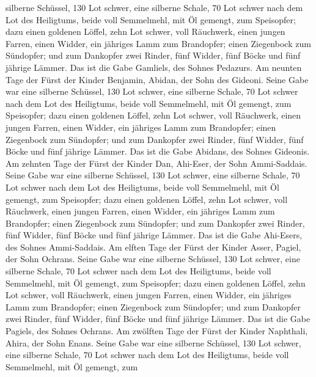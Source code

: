 silberne Schüssel, 130 Lot schwer, eine silberne Schale, 70 Lot schwer
nach dem Lot des Heiligtums, beide voll Semmelmehl, mit Öl gemengt, zum
Speisopfer;  dazu einen goldenen Löffel, zehn Lot schwer,
voll Räuchwerk,  einen jungen Farren, einen Widder, ein
jähriges Lamm zum Brandopfer;  einen Ziegenbock zum
Sündopfer;  und zum Dankopfer zwei Rinder, fünf Widder,
fünf Böcke und fünf jährige Lämmer. Das ist die Gabe Gamliels, des
Sohnes Pedazurs.  Am neunten Tage der Fürst der Kinder
Benjamin, Abidan, der Sohn des Gideoni.  Seine Gabe war
eine silberne Schüssel, 130 Lot schwer, eine silberne Schale, 70 Lot
schwer nach dem Lot des Heiligtums, beide voll Semmelmehl, mit Öl
gemengt, zum Speisopfer;  dazu einen goldenen Löffel, zehn
Lot schwer, voll Räuchwerk,  einen jungen Farren, einen
Widder, ein jähriges Lamm zum Brandopfer;  einen Ziegenbock
zum Sündopfer;  und zum Dankopfer zwei Rinder, fünf Widder,
fünf Böcke und fünf jährige Lämmer. Das ist die Gabe Abidans, des Sohnes
Gideonis.  Am zehnten Tage der Fürst der Kinder Dan,
Ahi-Eser, der Sohn Ammi-Saddais.  Seine Gabe war eine
silberne Schüssel, 130 Lot schwer, eine silberne Schale, 70 Lot schwer
nach dem Lot des Heiligtums, beide voll Semmelmehl, mit Öl gemengt, zum
Speisopfer;  dazu einen goldenen Löffel, zehn Lot schwer,
voll Räuchwerk,  einen jungen Farren, einen Widder, ein
jähriges Lamm zum Brandopfer;  einen Ziegenbock zum
Sündopfer;  und zum Dankopfer zwei Rinder, fünf Widder,
fünf Böcke und fünf jährige Lämmer. Das ist die Gabe Ahi-Esers, des
Sohnes Ammi-Saddais.  Am elften Tage der Fürst der Kinder
Asser, Pagiel, der Sohn Ochrans.  Seine Gabe war eine
silberne Schüssel, 130 Lot schwer, eine silberne Schale, 70 Lot schwer
nach dem Lot des Heiligtums, beide voll Semmelmehl, mit Öl gemengt, zum
Speisopfer;  dazu einen goldenen Löffel, zehn Lot schwer,
voll Räuchwerk,  einen jungen Farren, einen Widder, ein
jähriges Lamm zum Brandopfer;  einen Ziegenbock zum
Sündopfer;  und zum Dankopfer zwei Rinder, fünf Widder,
fünf Böcke und fünf jährige Lämmer. Das ist die Gabe Pagiels, des Sohnes
Ochrans.  Am zwölften Tage der Fürst der Kinder Naphthali,
Ahira, der Sohn Enans.  Seine Gabe war eine silberne
Schüssel, 130 Lot schwer, eine silberne Schale, 70 Lot schwer nach dem
Lot des Heiligtums, beide voll Semmelmehl, mit Öl gemengt, zum
